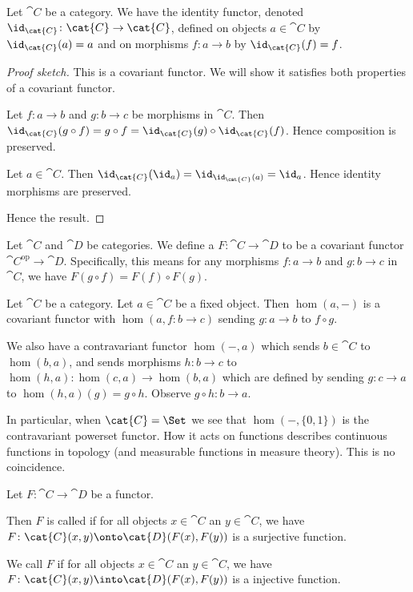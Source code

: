 \begin{example}
Let $\cat{C}$ be a category. We have the identity functor, denoted
$\id_{\cat{C}}\colon\cat{C}\to\cat{C}$, defined on objects
$a\in\cat{C}$ by $\id_{\cat{C}}(a)=a$ and on morphisms $f\colon a\to b$
by $\id_{\cat{C}}(f)=f$.

\begin{proof}[Proof sketch]
This is a covariant functor. We will show it satisfies both properties
of a covariant functor.

Let $f\colon a\to b$ and $g\colon b\to c$ be morphisms in
$\cat{C}$. Then $\id_{\cat{C}}(g\circ f)=g\circ f=\id_{\cat{C}}(g)\circ\id_{\cat{C}}(f)$.
Hence composition is preserved.

Let $a\in\cat{C}$. Then $\id_{\cat{C}}(\id_{a})=\id_{\id_{\cat{C}}(a)}=\id_{a}$.
Hence identity morphisms are preserved.

Hence the result.
\end{proof}
\end{example}

\begin{definition}
Let $\cat{C}$ and $\cat{D}$ be categories.
We define a  $F\colon\cat{C}\to\cat{D}$
to be a covariant functor
$\cat{C}^{\text{op}}\to\cat{D}$. Specifically, this means for any
morphisms $f\colon a\to b$ and $g\colon b\to c$ in $\cat{C}$, we have
$F(g\circ f)=F(f)\circ F(g)$.
\end{definition}

\begin{example}
Let $\cat{C}$ be a category. Let $a\in\cat{C}$ be a fixed object.
Then $\hom(a,-)$ is a covariant functor with $\hom(a,f\colon b\to c)$
sending $g\colon a\to b$ to $f\circ g$.

We also have a contravariant functor $\hom(-,a)$ which sends
$b\in\cat{C}$ to $\hom(b,a)$, and sends morphisms $h\colon b\to c$ to
$\hom(h,a)\colon\hom(c,a)\to\hom(b,a)$ which are defined by sending
$g\colon c\to a$ to $\hom(h,a)(g)=g\circ h$. Observe $g\circ h\colon b\to a$.

In particular, when $\cat{C}=\Set$ we see that $\hom(-,\{0,1\})$ is
the contravariant powerset functor. How it acts on functions describes
continuous functions in topology (and measurable functions in measure
theory). This is no coincidence.
\end{example}

\begin{definition}
Let $F\colon\cat{C}\to\cat{D}$ be a functor.

Then $F$ is called  if for
all objects $x\in\cat{C}$ an $y\in\cat{C}$, we have $F\colon\cat{C}(x,y)\onto\cat{D}(F(x),F(y))$
is a surjective function.

We call $F$  if for
all objects $x\in\cat{C}$ an $y\in\cat{C}$, we have $F\colon\cat{C}(x,y)\into\cat{D}(F(x),F(y))$
is a injective function.
\end{definition}

